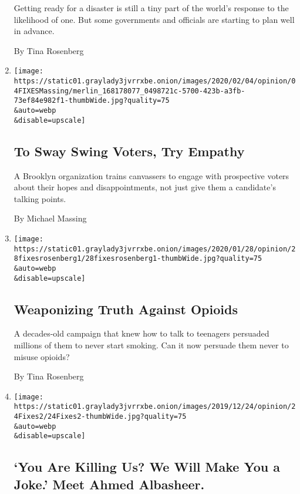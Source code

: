 \begin{enumerate}
  Getting ready for a disaster is still a tiny part of the world's
  response to the likelihood of one. But some governments and officials
  are starting to plan well in advance.

  By Tina Rosenberg
\item
  \href{/2020/02/04/opinion/election-2020.html}{}

  \texttt{[image: https://static01.graylady3jvrrxbe.onion/images/2020/02/04/opinion/04FIXESMassing/merlin\_168178077\_0498721c-5700-423b-a3fb-73ef84e982f1-thumbWide.jpg?quality=75\\\&auto=webp\\\&disable=upscale]}

  \hypertarget{to-sway-swing-voters-try-empathy}{%
  \subsection{To Sway Swing Voters, Try
  Empathy}\label{to-sway-swing-voters-try-empathy}}

  A Brooklyn organization trains canvassers to engage with prospective
  voters about their hopes and disappointments, not just give them a
  candidate's talking points.

  By Michael Massing
\item
  \href{/2020/01/28/opinion/opioid-drug-prevention-ads.html}{}

  \texttt{[image: https://static01.graylady3jvrrxbe.onion/images/2020/01/28/opinion/28fixesrosenberg1/28fixesrosenberg1-thumbWide.jpg?quality=75\\\&auto=webp\\\&disable=upscale]}

  \hypertarget{weaponizing-truth-against-opioids}{%
  \subsection{Weaponizing Truth Against
  Opioids}\label{weaponizing-truth-against-opioids}}

  A decades-old campaign that knew how to talk to teenagers persuaded
  millions of them to never start smoking. Can it now persuade them
  never to misuse opioids?

  By Tina Rosenberg
\item
  \href{/2019/12/26/opinion/albasheer-show-iraq-political-revolution.html}{}

  \texttt{[image: https://static01.graylady3jvrrxbe.onion/images/2019/12/24/opinion/24Fixes2/24Fixes2-thumbWide.jpg?quality=75\\\&auto=webp\\\&disable=upscale]}

  \hypertarget{you-are-killing-us-we-will-make-you-a-joke-meet-ahmed-albasheer}{%
  \subsection{`You Are Killing Us? We Will Make You a Joke.' Meet Ahmed
  Albasheer.}\label{you-are-killing-us-we-will-make-you-a-joke-meet-ahmed-albasheer}}


\end{enumerate}
